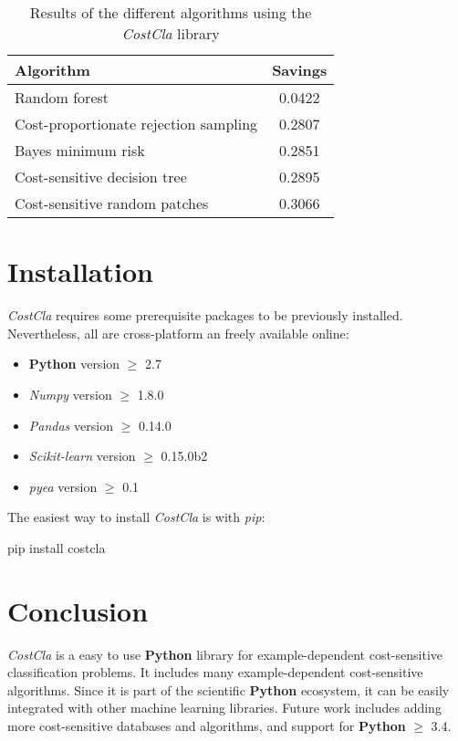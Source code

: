 \begin{table}[htbp]
    \centering
    \footnotesize
    \begin{tabular}{l|c}
      Algorithm & Savings \\
      \hline
      Random forest & 0.0422 \\
      Cost-proportionate rejection sampling & 0.2807\\
      Bayes minimum risk & 0.2851\\
      Cost-sensitive decision tree & 0.2895\\
      Cost-sensitive random patches & 0.3066\\   
    \end{tabular}
    \caption{Results of the different algorithms using the \textit{CostCla} library}
    \label{tab:9:1}
  \end{table}  

\section{Installation}

\textit{CostCla} requires some prerequisite packages to be previously installed. Nevertheless, all 
are cross-platform an freely available online:
\begin{itemize}
 \item \textbf{Python} version $\ge$ 2.7
 \item \textit{Numpy} version $\ge$ 1.8.0
 \item \textit{Pandas} version $\ge$ 0.14.0
 \item \textit{Scikit-learn} version $\ge$ 0.15.0b2
 \item \textit{pyea} version $\ge$ 0.1
\end{itemize}

\noindent The easiest way to install \textit{CostCla}  is with \textit{pip}:
\vskip0.3cm
\begin{pythoncode}
pip install costcla
\end{pythoncode}

\section{Conclusion}
\textit{CostCla} is a easy to use \textbf{Python} library for example-dependent cost-sensitive 
classification problems. It includes many example-dependent cost-sensitive algorithms. Since 
it is part of the scientific \textbf{Python} ecosystem, it can be easily integrated with other 
machine learning libraries. Future work includes adding more cost-sensitive databases and 
algorithms, and support for \textbf{Python} $\ge$ 3.4. 
